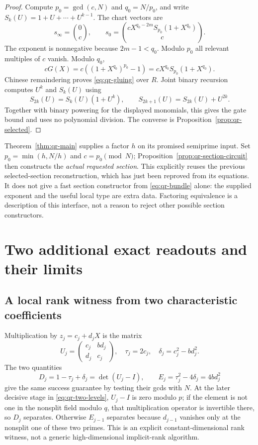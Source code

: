 \begin{proof}
Compute $p_0=\gcd(c,N)$ and $q_0=N/p_0$, and write
$S_k(U)=1+U+\cdots+U^{k-1}$.
The chart vectors are
\begin{equation}
 s_\infty=\binom0c,
 \qquad
 s_0=\binom{cX^{q_0-2m}S_{p_0}(1+X^{q_0})}{c}.
 \label{eq:qr-section-circuit}
\end{equation}
The exponent is nonnegative because $2m-1<q_0$.
Modulo $p_0$ all relevant multiples of $c$ vanish.
Modulo $q_0$,
\[
 cG(X)=c((1+X^{q_0})^{p_0}-1)
       =cX^{q_0}S_{p_0}(1+X^{q_0}).
\]
Chinese remaindering proves \eqref{eq:qr-gluing} over $R$.
Joint binary recursion computes $U^k$ and $S_k(U)$ using
\[
 S_{2k}(U)=S_k(U)(1+U^k),\qquad
 S_{2k+1}(U)=S_{2k}(U)+U^{2k}.
\]
Together with binary powering for the displayed monomials, this gives
the gate bound and uses no polynomial division.
The converse is Proposition~\ref{prop:qr-selected}.
\end{proof}

Theorem~\ref{thm:qr-main} supplies a factor $h$ on its promised
semiprime input.  Set $p_0=\min(h,N/h)$ and $c=p_0\pmod N$;
Proposition~\ref{prop:qr-section-circuit} then constructs the
\emph{actual requested section}.
This explicitly reuses the previous selected-section reconstruction,
which has just been reproved from its equations.
It does not give a fast section constructor from
\eqref{eq:qr-bundle} alone: the supplied exponent and the useful local
type are extra data.  Factoring equivalence is a description of this
interface, not a reason to reject other possible section constructors.

\section{Two additional exact readouts and their limits}

\subsection{A local rank witness from two characteristic coefficients}

Multiplication by $z_j=c_j+d_jX$ is the matrix
\[
 U_j=\begin{pmatrix}c_j&bd_j\\d_j&c_j\end{pmatrix},
 \quad \tau_j=2c_j,\quad\delta_j=c_j^2-bd_j^2.
\]
The two quantities
\[
 D_j=1-\tau_j+\delta_j=\det(U_j-I),
 \qquad E_j=\tau_j^2-4\delta_j=4bd_j^2
\]
give the same success guarantee by testing their gcds with $N$.
At the later decisive stage in \eqref{eq:qr-two-levels},
$U_j-I$ is zero modulo $p$; if the element is not one in the nonsplit
field modulo $q$, that multiplication operator is invertible there,
so $D_j$ separates.  Otherwise $E_{j-1}$ separates because
$d_{j-1}$ vanishes only at the nonsplit one of these two primes.
This is an explicit constant-dimensional rank witness, not a generic
high-dimensional implicit-rank algorithm.

